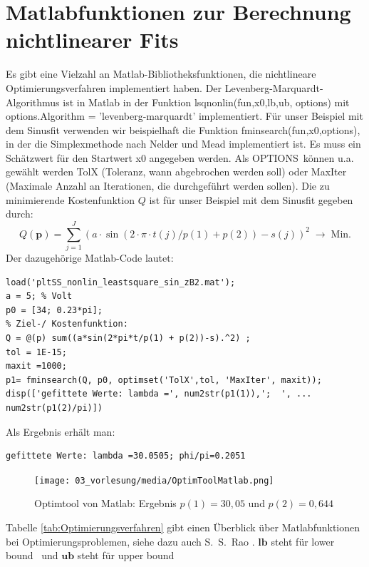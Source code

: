 \section{Matlabfunktionen zur Berechnung nichtlinearer Fits}
Es gibt eine Vielzahl an Matlab-Bibliotheksfunktionen, die nichtlineare Optimierungsverfahren implementiert haben. Der Levenberg-Marquardt-Algorithmus ist in Matlab in der Funktion \textsf{lsqnonlin(fun,x0,lb,ub, options)} mit 
\textsf{options.Algorithm = 'levenberg-marquardt'} implementiert.
Für unser Beispiel mit dem Sinusfit verwenden wir beispielhaft die Funktion \textsf{fminsearch(fun,x0,options)}, in der die Simplexmethode nach Nelder und Mead implementiert ist. Es muss ein Schätzwert 
für den Startwert \textrm{x0} angegeben werden. Als \glq OPTIONS\grq~können u.a. gewählt werden TolX (Toleranz, wann abgebrochen werden soll) oder MaxIter (Maximale Anzahl an Iterationen, die durchgeführt werden sollen).
Die zu minimierende Kostenfunktion $Q$ ist für unser Beispiel mit dem Sinusfit gegeben durch: 
\begin{equation}
Q(\boldsymbol{p}) = \sum_{j=1}^{J} (a \cdot \sin(2\cdot \pi \cdot t(j) /p(1) + p(2))-s(j))^2
\;\rightarrow \;\textrm{Min.}
\end{equation}
Der dazugehörige Matlab-Code lautet: 
\begin{verbatim}
load('pltSS_nonlin_leastsquare_sin_zB2.mat');
a = 5; % Volt
p0 = [34; 0.23*pi];
% Ziel-/ Kostenfunktion:
Q = @(p) sum((a*sin(2*pi*t/p(1) + p(2))-s).^2) ;
tol = 1E-15;
maxit =1000;
p1= fminsearch(Q, p0, optimset('TolX',tol, 'MaxIter', maxit));
disp(['gefittete Werte: lambda =', num2str(p1(1)),';  ', ...
num2str(p1(2)/pi)])
\end{verbatim}
Als Ergebnis erhält man: 
\begin{verbatim}
gefittete Werte: lambda =30.0505; phi/pi=0.2051
\end{verbatim}
\begin{figure}[htb]
	\begin{center}
		\texttt{[image: 03\_vorlesung/media/OptimToolMatlab.png]}
	\end{center}
	\caption{Optimtool von Matlab: Ergebnis $p(1)=30,05$ und $p(2)=0,644$} \label{fig:Optimtool_von_Matlab}
\end{figure}

\newpage
Tabelle \ref*{tab:Optimierungsverfahren} gibt einen Überblick über 
Matlabfunktionen bei Optimierungsproblemen, siehe dazu auch 
S.~S.~Rao \cite{Rao09}. $\mathbf{lb}$ steht für \glq lower bound\grq~ und $\mathbf{ub}$ steht für \glq upper bound\grq~

